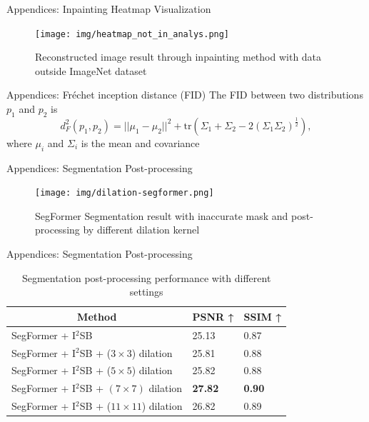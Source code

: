\begin{frame}{Appendices: Inpainting Heatmap Visualization}
\setcounter{footnote}{0}
    \begin{figure}
        \centering
        \texttt{[image: img/heatmap\_not\_in\_analys.png]}
        \caption{Reconstructed image result through inpainting method with data outside ImageNet dataset \footnotemark}
        \label{fig:enter-label}
    \end{figure}
\end{frame}

\begin{frame}{Appendices: Fréchet inception distance (FID)}
The FID between two distributions $p_1$ and $p_2$ is 
$$d^2_F(p_1,p_2)=||\mu_1-\mu_2||^2+\mathrm{tr}(\Sigma_1+\Sigma_2-2(\Sigma_1\Sigma_2)^\frac{1}{2}),$$
where $\mu_i$ and $\Sigma_i$ is the mean and covariance
\end{frame}

\begin{frame}{Appendices: Segmentation Post-processing}
\begin{figure}[t]
    \centering
    \texttt{[image: img/dilation-segformer.png]}
    \caption[SegFormer Segmentation post-processing]{SegFormer Segmentation result with inaccurate mask and post-processing by different dilation kernel}
    \label{fig:segformer-no-dilate}
\end{figure}
\end{frame}

\begin{frame}{Appendices: Segmentation Post-processing}
    \begin{table}[t]
    \centering
    \begin{tabular}{lll}
        \hline
        \multicolumn{1}{c}{\textbf{Method}}                                                & \multicolumn{1}{c}{\textbf{PSNR ↑}} & \multicolumn{1}{c}{\textbf{SSIM ↑}} \\ \hline
        SegFormer + I$^2$SB & 25.13                                & 0.87                                 \\ 
        SegFormer + I$^2$SB + ($3 \times 3$) dilation & {25.81}                       & {0.88}                        \\ 
        SegFormer + I$^2$SB + ($5 \times 5$) dilation & {25.82}                       & {0.88}                        \\ 
        SegFormer + I$^2$SB + ${(7 \times 7)}$ {dilation} & \textbf{27.82}                       & \textbf{0.90}                        \\ 
        SegFormer + I$^2$SB + ($11 \times 11$) dilation & {26.82}                       & {0.89}                        \\ \hline
    \end{tabular}
    \caption{Segmentation post-processing performance with different settings}
    \label{table:segformer-kernel}
\end{table}
\end{frame}


